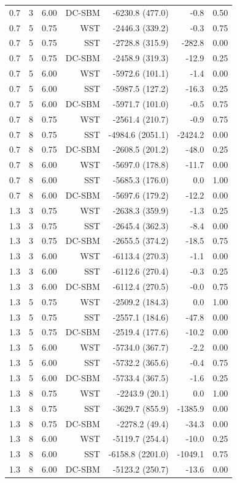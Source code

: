 \begin{table}[!h]
\begin{tabular}[t]{rrrrrrr}
0.7 & 3 & 6.00 & DC-SBM & -6230.8 (477.0) & -0.8 & 0.50\\
0.7 & 5 & 0.75 & WST & -2446.3 (339.2) & -0.3 & 0.75\\
0.7 & 5 & 0.75 & SST & -2728.8 (315.9) & -282.8 & 0.00\\
0.7 & 5 & 0.75 & DC-SBM & -2458.9 (319.3) & -12.9 & 0.25\\
0.7 & 5 & 6.00 & WST & -5972.6 (101.1) & -1.4 & 0.00\\
0.7 & 5 & 6.00 & SST & -5987.5 (127.2) & -16.3 & 0.25\\
0.7 & 5 & 6.00 & DC-SBM & -5971.7 (101.0) & -0.5 & 0.75\\
0.7 & 8 & 0.75 & WST & -2561.4 (210.7) & -0.9 & 0.75\\
0.7 & 8 & 0.75 & SST & -4984.6 (2051.1) & -2424.2 & 0.00\\
0.7 & 8 & 0.75 & DC-SBM & -2608.5 (201.2) & -48.0 & 0.25\\
0.7 & 8 & 6.00 & WST & -5697.0 (178.8) & -11.7 & 0.00\\
0.7 & 8 & 6.00 & SST & -5685.3 (176.0) & 0.0 & 1.00\\
0.7 & 8 & 6.00 & DC-SBM & -5697.6 (179.2) & -12.2 & 0.00\\
1.3 & 3 & 0.75 & WST & -2638.3 (359.9) & -1.3 & 0.25\\
1.3 & 3 & 0.75 & SST & -2645.4 (362.3) & -8.4 & 0.00\\
1.3 & 3 & 0.75 & DC-SBM & -2655.5 (374.2) & -18.5 & 0.75\\
1.3 & 3 & 6.00 & WST & -6113.4 (270.3) & -1.1 & 0.00\\
1.3 & 3 & 6.00 & SST & -6112.6 (270.4) & -0.3 & 0.25\\
1.3 & 3 & 6.00 & DC-SBM & -6112.4 (270.5) & -0.0 & 0.75\\
1.3 & 5 & 0.75 & WST & -2509.2 (184.3) & 0.0 & 1.00\\
1.3 & 5 & 0.75 & SST & -2557.1 (184.6) & -47.8 & 0.00\\
1.3 & 5 & 0.75 & DC-SBM & -2519.4 (177.6) & -10.2 & 0.00\\
1.3 & 5 & 6.00 & WST & -5734.0 (367.7) & -2.2 & 0.00\\
1.3 & 5 & 6.00 & SST & -5732.2 (365.6) & -0.4 & 0.75\\
1.3 & 5 & 6.00 & DC-SBM & -5733.4 (367.5) & -1.6 & 0.25\\
1.3 & 8 & 0.75 & WST & -2243.9 (20.1) & 0.0 & 1.00\\
1.3 & 8 & 0.75 & SST & -3629.7 (855.9) & -1385.9 & 0.00\\
1.3 & 8 & 0.75 & DC-SBM & -2278.2 (49.4) & -34.3 & 0.00\\
1.3 & 8 & 6.00 & WST & -5119.7 (254.4) & -10.0 & 0.25\\
1.3 & 8 & 6.00 & SST & -6158.8 (2201.0) & -1049.1 & 0.75\\
1.3 & 8 & 6.00 & DC-SBM & -5123.2 (250.7) & -13.6 & 0.00\\
\bottomrule
\end{tabular}
\end{table}
